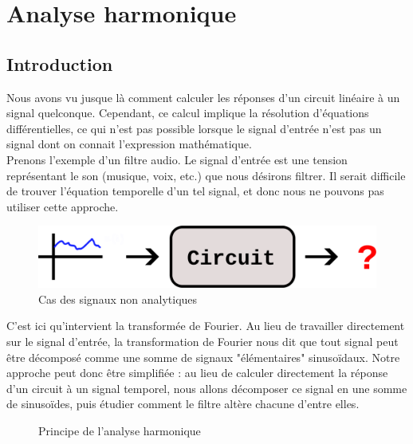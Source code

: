 \chapter{Analyse harmonique}

\section{Introduction}

Nous avons vu jusque là comment calculer les réponses d'un circuit linéaire à un signal quelconque. Cependant, ce calcul implique la résolution d'équations différentielles, ce qui n'est pas possible lorsque le signal d'entrée n'est pas un signal dont on connait l'expression mathématique. \\

Prenons l'exemple d'un filtre audio. Le signal d'entrée est une tension représentant le son (musique, voix, etc.) que nous désirons filtrer. Il serait difficile de trouver l'équation temporelle d'un tel signal, et donc nous ne pouvons pas utiliser cette approche. \\

\begin{figure}[!h]
\begin{center}
\includegraphics{part02/chap07/intro01.png}
\end{center}
	\caption{ Cas des signaux non analytiques}
\end{figure}

C'est ici qu'intervient la transformée de Fourier. Au lieu de travailler directement sur le signal d'entrée, la transformation de Fourier nous dit que tout signal peut être décomposé comme une somme de signaux "élémentaires" sinusoïdaux. Notre approche peut donc être simplifiée : au lieu de calculer directement la réponse d'un circuit à un signal temporel, nous allons décomposer ce signal en une somme de sinusoïdes, puis étudier comment le filtre altère chacune d'entre elles. \\

\begin{figure}[!h]
\begin{center}

\end{center}
	\caption{Principe de l'analyse harmonique}
\end{figure}

